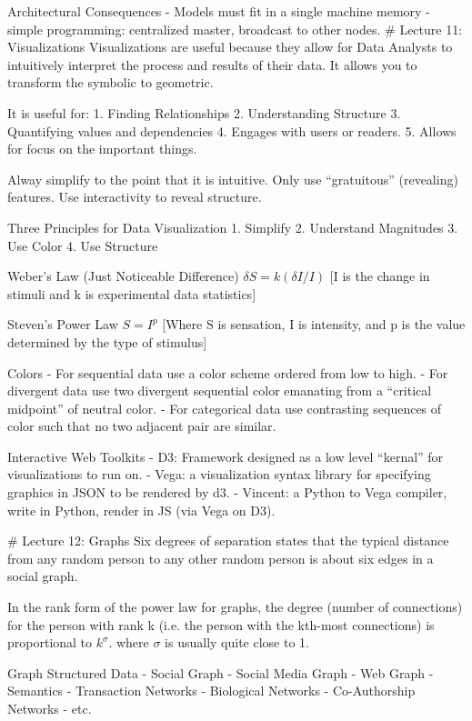 \documentclass[3pt,landscape]{article}
\begin{document}
\begin{multicols}{3}
Architectural Consequences
- Models must fit in a single machine memory 
- simple programming: centralized master, broadcast to other nodes. 
\# Lecture 11: Visualizations
Visualizations are useful because they allow for Data Analysts to intuitively interpret the process and results of their data.  It allows you to transform the symbolic to geometric. 

It is useful for: 
1. Finding Relationships
2. Understanding Structure
3. Quantifying values and dependencies
4. Engages with users or readers.
5. Allows for focus on the important things. 

Alway simplify to the point that it is intuitive. Only use “gratuitous” (revealing) features. Use interactivity to reveal structure.

Three Principles for Data Visualization
1. Simplify
2. Understand Magnitudes
3. Use Color
4. Use Structure

Weber’s Law (Just Noticeable Difference)
$\delta S = k(\delta I/I)$
[I is the change in stimuli and k is experimental data statistics]

Steven’s Power Law
$S = I^p$
[Where S is sensation, I is intensity, and p is the value determined by the type of stimulus]

Colors
- For sequential data use a color scheme ordered from low to high. 
- For divergent data use two divergent sequential color emanating from a “critical midpoint” of neutral color. 
- For categorical data use contrasting sequences of color such that no two adjacent pair are similar. 



Interactive Web Toolkits
- D3: Framework designed as a low level “kernal” for visualizations to run on.  
- Vega: a visualization syntax library for specifying graphics in JSON to be rendered by d3.
- Vincent: a Python to Vega compiler, write in Python, render in JS (via Vega on D3).

\# Lecture 12: Graphs
Six degrees of separation states that the typical distance from any random person to any other random person is about six edges in a social graph. 

In the rank form of the power law for graphs, the degree (number of connections) for the person with rank k (i.e. the person with the kth-most connections) is proportional to $k^\sigma$. where $\sigma$ is usually quite close to 1.

Graph Structured Data
- Social Graph
- Social Media Graph
- Web Graph
- Semantics
- Transaction Networks
- Biological Networks
- Co-Authorship Networks
- etc.


\end{multicols}
\end{document}
